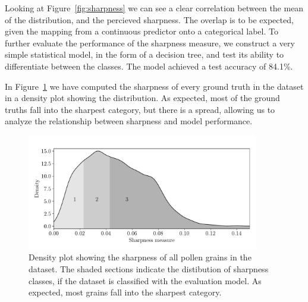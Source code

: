 Looking at Figure~\ref{fig:sharpness} we can see a clear correlation between the mean of the distribution, and the percieved sharpness.
The overlap is to be expected, given the mapping from a continuous predictor onto a categorical label.
To further evaluate the performance of the sharpness measure, we construct a very simple statistical model, in the form of a decision tree, and test its ability to differentiate between the classes.
The model achieved a test accuracy of 84.1\%. 

In Figure~\ref{fig:sharpness-all} we have computed the sharpness of every ground truth in the dataset in a density plot showing the distribution.
As expected, most of the ground truths fall into the sharpest category, but there is a spread, allowing us to analyze the relationship between sharpness and model performance.

\begin{figure}[htbp]
  \centering
  \includegraphics[width=0.9\textwidth]{figs/sharpness_all.pdf}
  \caption[Distribution of sharpness accross entire dataset]{Density plot showing the sharpness of all pollen grains in the dataset. The shaded sections indicate the distibution of sharpness classes, if the dataset is classified with the evaluation model. As expected, most grains fall into the sharpest category.}\label{fig:sharpness-all}
\end{figure}